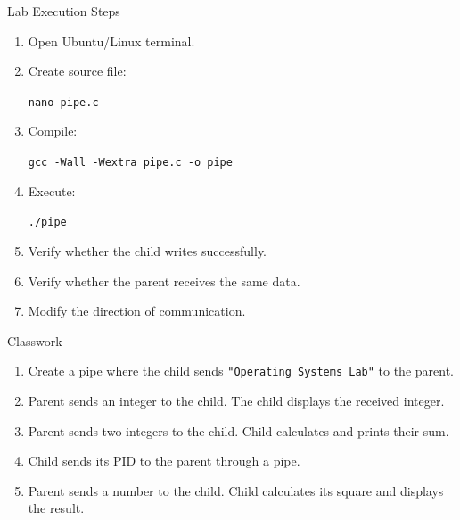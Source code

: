\documentclass[aspectratio=169]{beamer}
\begin{document}
\begin{frame}{Lab Execution Steps}

\begin{enumerate}

    \item Open Ubuntu/Linux terminal.

    \item Create source file:
    \begin{center}
    \texttt{nano pipe.c}
    \end{center}

    \item Compile:
    \begin{center}
    \texttt{gcc -Wall -Wextra pipe.c -o pipe}
    \end{center}

    \item Execute:
    \begin{center}
    \texttt{./pipe}
    \end{center}

    \item Verify whether the child writes successfully.

    \item Verify whether the parent receives the same data.

    \item Modify the direction of communication.

\end{enumerate}

\end{frame}

\begin{frame}{Classwork}

\begin{enumerate}

    \item Create a pipe where the child sends
    \texttt{"Operating Systems Lab"} to the parent.

    \item Parent sends an integer to the child.
    The child displays the received integer.

    \item Parent sends two integers to the child.
    Child calculates and prints their sum.

    \item Child sends its PID to the parent through a pipe.

    \item Parent sends a number to the child.
    Child calculates its square and displays the result.

\end{enumerate}

\end{frame}
\end{document}
